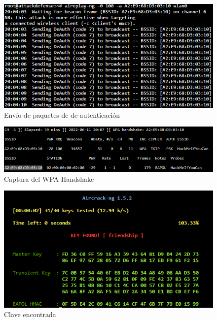 \documentclass{article}
\begin{document}
        \begin{figure}[!h]
            \centering
            \includegraphics[scale=0.8]{img/aireplay.png}
            \caption{Envío de paquetes de de-autenticación}
            \label{fig:step5}
        \end{figure}

        \clearpage
        \begin{figure}[!h]
            \centering
            \includegraphics[scale=0.7]{img/handshake_captured.png}
            \caption{Captura del WPA Handshake}
            \label{fig:step6}
        \end{figure}

        \begin{figure}[!h]
            \centering
            \includegraphics[scale=0.7]{img/flag.png}
            \caption{Clave encontrada}
            \label{fig:step7}
        \end{figure}
\end{document}
